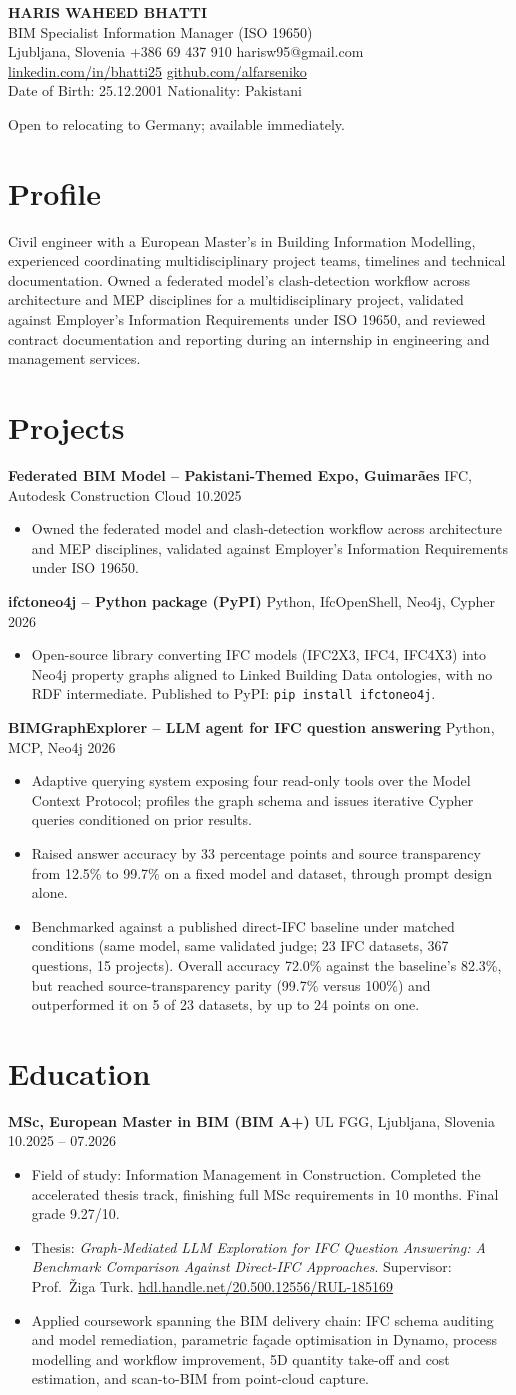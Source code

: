 \documentclass[a4paper,10.5pt]{article}
\newcommand{\datefill}{\dotfill}
\newcommand{\entry}[3]{\vspace{2.5pt}\noindent\textbf{#1} \textbar{} #2 \datefill{} #3\par\vspace{0.5pt}}
\newcommand{\ROLELINE}{BIM Specialist \textbar{} Information Manager (ISO 19650)}
\newcommand{\projIfcToNeo}{%
\entry{ifctoneo4j -- Python package (PyPI)}{Python, IfcOpenShell, Neo4j, Cypher}{2026}
\begin{itemize}
  \item Open-source library converting IFC models (IFC2X3, IFC4, IFC4X3) into Neo4j
        property graphs aligned to Linked Building Data ontologies, with no RDF
        intermediate. Published to PyPI: \texttt{pip install ifctoneo4j}.
\end{itemize}}
\newcommand{\projBIMGraph}{%
\entry{BIMGraphExplorer -- LLM agent for IFC question answering}{Python, MCP, Neo4j}{2026}
\begin{itemize}
  \item Adaptive querying system exposing four read-only tools over the Model
        Context Protocol; profiles the graph schema and issues iterative Cypher
        queries conditioned on prior results.
  \item Raised answer accuracy by 33 percentage points and source transparency from
        12.5\% to 99.7\% on a fixed model and dataset, through prompt design alone.
  \item Benchmarked against a published direct-IFC baseline under matched
        conditions (same model, same validated judge; 23 IFC datasets, 367
        questions, 15 projects). Overall accuracy 72.0\% against the baseline's
        82.3\%, but reached source-transparency parity (99.7\% versus 100\%) and
        outperformed it on 5 of 23 datasets, by up to 24 points on one.
\end{itemize}}
\newcommand{\projGuimaraes}{%
\entry{Federated BIM Model -- Pakistani-Themed Expo, Guimar\~aes}{IFC, Autodesk Construction Cloud}{10.2025}
\begin{itemize}
  \item Owned the federated model and clash-detection workflow across architecture
        and MEP disciplines, validated against Employer's Information Requirements
        under ISO 19650.
\end{itemize}}
\begin{document}
\begin{center}
  {\LARGE\bfseries HARIS WAHEED BHATTI}\\[2pt]
  {\large \ROLELINE}\\[3pt]
  Ljubljana, Slovenia \textbar{} +386 69 437 910 \textbar{} harisw95@gmail.com\\
  \href{https://linkedin.com/in/bhatti25}{linkedin.com/in/bhatti25} \textbar{}
  \href{https://github.com/alfarseniko}{github.com/alfarseniko}\\
  Date of Birth: 25.12.2001 \textbar{} Nationality: Pakistani
\end{center}
\vspace{-4pt}
\noindent\small Open to relocating to Germany; available immediately.\normalsize

\section{Profile}

\noindent Civil engineer with a European Master's in Building Information Modelling,
experienced coordinating multidisciplinary project teams, timelines and technical
documentation. Owned a federated model's clash-detection workflow across
architecture and MEP disciplines for a multidisciplinary project, validated against
Employer's Information Requirements under ISO 19650, and reviewed contract
documentation and reporting during an internship in engineering and management
services.

\section{Projects}

 \projGuimaraes \projIfcToNeo \projBIMGraph

\section{Education}
\entry{MSc, European Master in BIM (BIM A+)}{UL FGG, Ljubljana, Slovenia}{10.2025 -- 07.2026}
\begin{itemize}
  \item Field of study: Information Management in Construction. Completed the
        accelerated thesis track, finishing full MSc requirements in 10 months.
        Final grade 9.27/10.
  \item Thesis: \textit{Graph-Mediated LLM Exploration for IFC Question Answering:
        A Benchmark Comparison Against Direct-IFC Approaches}. Supervisor:
        Prof.~\v{Z}iga Turk. \href{http://hdl.handle.net/20.500.12556/RUL-185169}{hdl.handle.net/20.500.12556/RUL-185169}
  \item Applied coursework spanning the BIM delivery chain: IFC schema auditing and model remediation, parametric façade optimisation in Dynamo, process modelling and workflow improvement, 5D quantity take-off and cost estimation, and scan-to-BIM from point-cloud capture.
\end{itemize}
\end{document}
